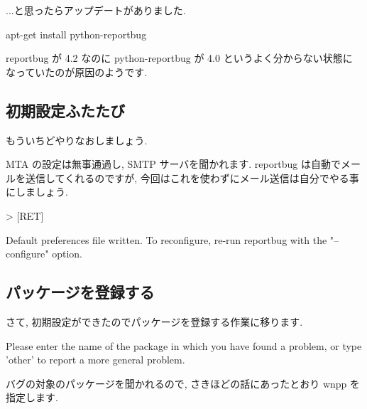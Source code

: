 \documentclass[mingoth,a4paper]{jsarticle}
\begin{document}
\begin{commandline}
...と思ったらアップデートがありました.

\begin{commandline}
apt-get install python-reportbug
\end{commandline}

reportbug が 4.2 なのに python-reportbug が 4.0 というよく分からない状態に
なっていたのが原因のようです.

\subsection{初期設定ふたたび}

もういちどやりなおしましょう.


MTA の設定は無事通過し, SMTP サーバを聞かれます.
reportbug は自動でメールを送信してくれるのですが,
今回はこれを使わずにメール送信は自分でやる事にしましょう.

\begin{commandline}
> [RET]

Default preferences file written. To reconfigure, re-run reportbug with the "--
configure" option.
\end{commandline}

\subsection{パッケージを登録する}

さて, 初期設定ができたのでパッケージを登録する作業に移ります.

\begin{commandline}
Please enter the name of the package in which you have found a problem, or type
'other' to report a more general problem.
\end{commandline}

バグの対象のパッケージを聞かれるので,
さきほどの話にあったとおり wnpp を指定します.


\end{commandline}
\end{document}
